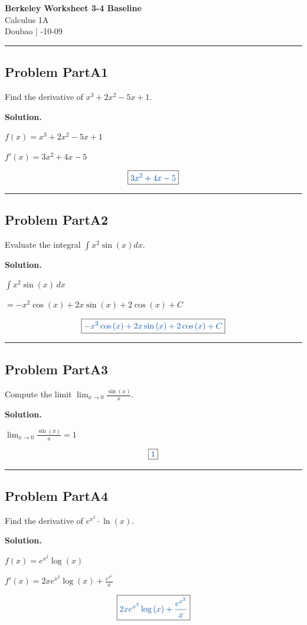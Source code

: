 \documentclass[11pt, a4paper]{ctexart}
\newcommand{\problem}[1]{\subsection*{Problem #1}}
\newcommand{\solution}{\par\noindent\textbf{Solution.}\par\smallskip}
\begin{document}
\begin{center}
  {\LARGE\bfseries Berkeley Worksheet 3-4 Baseline}\\[0.4em]
  {\large Calculus 1A}\\[0.25em]
  Doubao \quad | -10-09
\end{center}

\hrule
\vspace{0.8em}
\problem{PartA1}

Find the derivative of $x^3 + 2x^2 - 5x + 1$.

\solution
$f(x) = x^{3} + 2 x^{2} - 5 x + 1$

$f'(x) = 3 x^{2} + 4 x - 5$

\[\boxed{\textcolor{anscolor}{3 x^{2} + 4 x - 5}}\]

\vspace{0.6em}\hrule\vspace{0.6em}
\problem{PartA2}

Evaluate the integral $\int x^2 \sin(x) dx$.

\solution
$\int x^{2} \sin{\left(x \right)}\,dx$

$= - x^{2} \cos{\left(x \right)} + 2 x \sin{\left(x \right)} + 2 \cos{\left(x \right)} + C$

\[\boxed{\textcolor{anscolor}{- x^{2} \cos{\left(x \right)} + 2 x \sin{\left(x \right)} + 2 \cos{\left(x \right)} + C}}\]

\vspace{0.6em}\hrule\vspace{0.6em}
\problem{PartA3}

Compute the limit $\lim_{x \to 0} \frac{\sin(x)}{x}$.

\solution
$\lim_{x \to 0} \frac{\sin{\left(x \right)}}{x} = 1$

\[\boxed{\textcolor{anscolor}{1}}\]

\vspace{0.6em}\hrule\vspace{0.6em}
\problem{PartA4}

Find the derivative of $e^{x^2} \cdot \ln(x)$.

\solution
$f(x) = e^{x^{2}} \log{\left(x \right)}$

$f'(x) = 2 x e^{x^{2}} \log{\left(x \right)} + \frac{e^{x^{2}}}{x}$

\[\boxed{\textcolor{anscolor}{2 x e^{x^{2}} \log{\left(x \right)} + \frac{e^{x^{2}}}{x}}}\]
\end{document}
